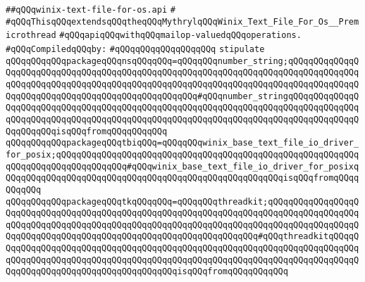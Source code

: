 \label{src/lib/std/src/io/winix-text-file-for-os.api}
\verb|##qQQqwinix-text-file-for-os.api|\newline
\verb|#|\newline
\verb|#qQQqThisqQQqextendsqQQqtheqQQqMythrylqQQqWinix_Text_File_For_Os__Premicrothread|\newline
\verb|#qQQqapiqQQqwithqQQqmailop-valuedqQQqoperations.|\newline
\newline
\verb|#qQQqCompiledqQQqby:|\newline
\verb|#qQQqqQQqqQQqqQQqqQQq|\newline
\newline
\newline
\newline
\verb|stipulate|\newline
\verb|qQQqqQQqqQQqpackageqQQqnsqQQqqQQq=qQQqqQQqnumber_string;qQQqqQQqqQQqqQQqqQQqqQQqqQQqqQQqqQQqqQQqqQQqqQQqqQQqqQQqqQQqqQQqqQQqqQQqqQQqqQQqqQQqqQQqqQQqqQQqqQQqqQQqqQQqqQQqqQQqqQQqqQQqqQQqqQQqqQQqqQQqqQQqqQQqqQQqqQQqqQQqqQQqqQQqqQQqqQQqqQQqqQQqqQQqqQQq#qQQqnumber_stringqQQqqQQqqQQqqQQqqQQqqQQqqQQqqQQqqQQqqQQqqQQqqQQqqQQqqQQqqQQqqQQqqQQqqQQqqQQqqQQqqQQqqQQqqQQqqQQqqQQqqQQqqQQqqQQqqQQqqQQqqQQqqQQqqQQqqQQqqQQqqQQqqQQqqQQqqQQqqQQqqQQqisqQQqfromqQQqqQQqqQQq|\newline
\verb|qQQqqQQqqQQqpackageqQQqtbiqQQq=qQQqqQQqwinix_base_text_file_io_driver_for_posix;qQQqqQQqqQQqqQQqqQQqqQQqqQQqqQQqqQQqqQQqqQQqqQQqqQQqqQQqqQQqqQQqqQQqqQQqqQQqqQQqqQQq#qQQqwinix_base_text_file_io_driver_for_posixqQQqqQQqqQQqqQQqqQQqqQQqqQQqqQQqqQQqqQQqqQQqqQQqqQQqqQQqisqQQqfromqQQqqQQqqQQq|\newline
\verb|qQQqqQQqqQQqpackageqQQqtkqQQqqQQq=qQQqqQQqthreadkit;qQQqqQQqqQQqqQQqqQQqqQQqqQQqqQQqqQQqqQQqqQQqqQQqqQQqqQQqqQQqqQQqqQQqqQQqqQQqqQQqqQQqqQQqqQQqqQQqqQQqqQQqqQQqqQQqqQQqqQQqqQQqqQQqqQQqqQQqqQQqqQQqqQQqqQQqqQQqqQQqqQQqqQQqqQQqqQQqqQQqqQQqqQQqqQQqqQQqqQQqqQQqqQQq#qQQqthreadkitqQQqqQQqqQQqqQQqqQQqqQQqqQQqqQQqqQQqqQQqqQQqqQQqqQQqqQQqqQQqqQQqqQQqqQQqqQQqqQQqqQQqqQQqqQQqqQQqqQQqqQQqqQQqqQQqqQQqqQQqqQQqqQQqqQQqqQQqqQQqqQQqqQQqqQQqqQQqqQQqqQQqqQQqqQQqqQQqqQQqisqQQqfromqQQqqQQqqQQq|\newline
